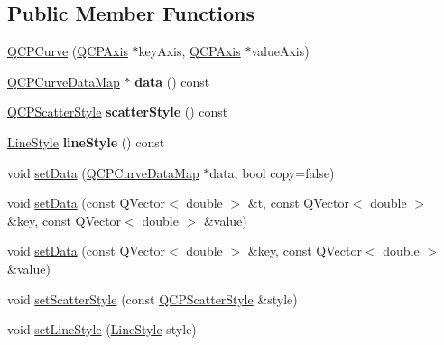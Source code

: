\subsection*{Public Member Functions}
\begin{DoxyCompactItemize}
\item 
\mbox{\hyperlink{class_q_c_p_curve_a36de58e2652b3fa47bdf9187d421d3ce}{Q\+C\+P\+Curve}} (\mbox{\hyperlink{class_q_c_p_axis}{Q\+C\+P\+Axis}} $\ast$key\+Axis, \mbox{\hyperlink{class_q_c_p_axis}{Q\+C\+P\+Axis}} $\ast$value\+Axis)
\item 
\mbox{\label{class_q_c_p_curve_a667ca2594cf651e3032c624dbaa95add}} 
\mbox{\hyperlink{qcustomplot_8h_a444d37ec9cb2951b3a7fe443c34d1658}{Q\+C\+P\+Curve\+Data\+Map}} $\ast$ {\bfseries data} () const
\item 
\mbox{\label{class_q_c_p_curve_afa6bd72a3a331a5ed45d3e0c5843b592}} 
\mbox{\hyperlink{class_q_c_p_scatter_style}{Q\+C\+P\+Scatter\+Style}} {\bfseries scatter\+Style} () const
\item 
\mbox{\label{class_q_c_p_curve_a06e3cf3f8f1add689254b3cda66e040e}} 
\mbox{\hyperlink{class_q_c_p_curve_a2710e9f79302152cff794c6e16cc01f1}{Line\+Style}} {\bfseries line\+Style} () const
\item 
void \mbox{\hyperlink{class_q_c_p_curve_a631ac886708460013b30052f49cbc9da}{set\+Data}} (\mbox{\hyperlink{qcustomplot_8h_a444d37ec9cb2951b3a7fe443c34d1658}{Q\+C\+P\+Curve\+Data\+Map}} $\ast$data, bool copy=false)
\item 
void \mbox{\hyperlink{class_q_c_p_curve_affe80e011e2ced62a88f614acd6ab8d1}{set\+Data}} (const Q\+Vector$<$ double $>$ \&t, const Q\+Vector$<$ double $>$ \&key, const Q\+Vector$<$ double $>$ \&value)
\item 
void \mbox{\hyperlink{class_q_c_p_curve_a963d4c45777deef15848a8f56172d066}{set\+Data}} (const Q\+Vector$<$ double $>$ \&key, const Q\+Vector$<$ double $>$ \&value)
\item 
void \mbox{\hyperlink{class_q_c_p_curve_a55e43b44709bf50a35500644988aa706}{set\+Scatter\+Style}} (const \mbox{\hyperlink{class_q_c_p_scatter_style}{Q\+C\+P\+Scatter\+Style}} \&style)
\item 
void \mbox{\hyperlink{class_q_c_p_curve_a4a377ec863ff81a1875c3094a6177c19}{set\+Line\+Style}} (\mbox{\hyperlink{class_q_c_p_curve_a2710e9f79302152cff794c6e16cc01f1}{Line\+Style}} style)

\end{DoxyCompactItemize}
